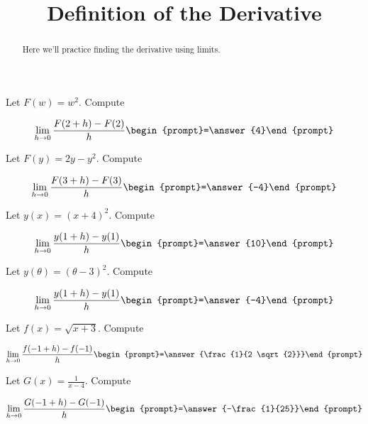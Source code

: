 \documentclass[handout]{ximera}
\title[Exercises:]{Definition of the Derivative}
\begin{document}
\begin{abstract}
  Here we'll practice finding the derivative using limits.
\end{abstract}
\maketitle

\begin{exercise}
Let $F(w) = w^2$. Compute

\[
\lim_{ h\to 0 } 
\frac{F(2+h)-F(2)}{h} \begin{prompt}=\answer{4}\end{prompt}
\]
\end{exercise}

\begin{exercise}
Let $F(y) = 2y-y^2$. Compute

\[
\lim_{ h\to 0 } 
\frac{F(3+h)-F(3)}{h} \begin{prompt}=\answer{-4}\end{prompt}
\]
\end{exercise}

\begin{exercise}
Let $y(x) = (x+4)^2$. Compute

\[
\lim_{ h\to 0 } \frac{y(1+h)-y(1)}{h} \begin{prompt}=\answer{10}\end{prompt}
\]
\end{exercise}


\begin{exercise}
Let $y(\theta) = (\theta -3)^2$. Compute

\[
\lim_{ h\to 0 } \frac{y(1+h)-y(1)}{h} \begin{prompt}=\answer{-4}\end{prompt}
\]
\end{exercise}


\begin{exercise}
Let $f(x) = \sqrt{x+3}$. Compute

\[
\lim_{ h\to 0 } 
\frac{f(-1+h)-f(-1)}{h} \begin{prompt}=\answer{\frac{1}{2 \sqrt{2}}}\end{prompt}
\]
\end{exercise}


\begin{exercise}
Let $G(x) = \frac{1}{x-4}$. Compute

\[
\lim_{ h\to 0 } \frac{G(-1+h)-G(-1)}{h} \begin{prompt}=\answer{-\frac{1}{25}}\end{prompt}
\]
\end{exercise}
\end{document}

